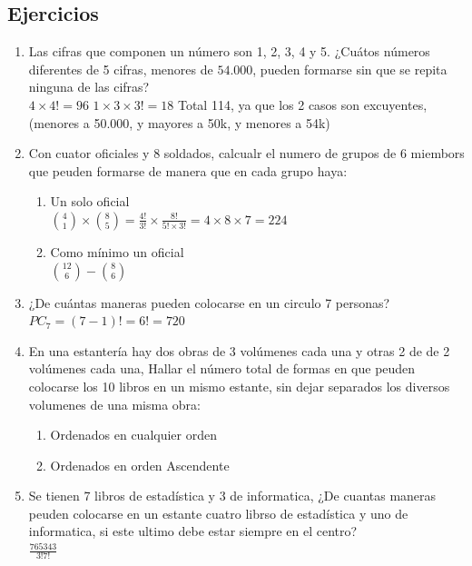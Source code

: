\documentclass[12pt, letterpaper]{article}
\begin{document}
\subsection{Ejercicios}
\begin{enumerate}
	\item Las cifras que componen un número son 1, 2, 3, 4 y 5. ¿Cuátos números diferentes de 5 cifras, menores de $54.000$, pueden formarse sin que se repita ninguna de las cifras? \\
        $4 \times 4! = 96$ $1 \times 3 \times 3! = 18 $ Total 114, ya que los 2 casos son excuyentes, (menores a 50.000, y mayores a 50k, y menores a 54k)
	\item Con cuator oficiales y 8 soldados, calcualr el numero de grupos de 6 miembors que peuden formarse de manera que en cada grupo haya:
	      \begin{enumerate}
		      \item Un solo oficial \\
                  $\binom{4}{1} \times \binom{8}{5} = \frac{4!}{3!} \times \frac{8!}{5! \times 3!} = 4 \times 8 \times 7 = 224 $
		      \item Como mínimo un oficial \\
                  $\binom{12}{6} - \binom{8}{6} $
	      \end{enumerate}
	\item ¿De cuántas maneras pueden colocarse en un circulo 7 personas? \\ 
        $PC_7 = (7-1)! = 6! = 720$
	\item En una estantería hay dos obras de 3 volúmenes cada una y otras 2 de de 2 volúmenes cada una, Hallar el número total de formas en que peuden colocarse los 10 libros en un mismo estante, sin dejar separados los diversos volumenes de una misma obra:
	      \begin{enumerate}
		      \item Ordenados en cualquier orden
		      \item Ordenados en orden Ascendente
	      \end{enumerate}
	\item Se tienen 7 libros de estadística y 3 de informatica, ¿De cuantas maneras peuden colocarse en un estante cuatro librso de estadística y uno de informatica, si este ultimo debe estar siempre en el centro? \\
	      $\frac{7 6 5 3 4 3 }{3! 7!}$
\end{enumerate}
\end{document}
